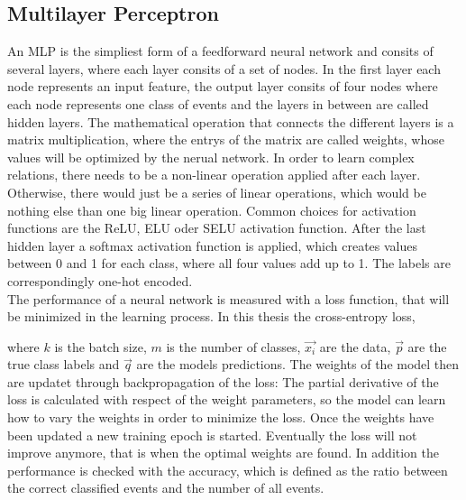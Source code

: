 \label{sec:deepl}

\subsection{Multilayer Perceptron}
\label{sec:funcmlp}

An MLP is the simpliest form of a feedforward neural network and consits of several layers, where each layer consits of a set of nodes. In the first layer each node represents an input feature, the output layer consits of four nodes where each node represents one class of events
and the layers in between are called hidden layers. The mathematical operation that connects the different layers
is a matrix multiplication, where the entrys of the matrix are called weights, whose values will be optimized by the nerual network. In order to learn complex
relations, there needs to be a non-linear operation applied after each layer. Otherwise, there would just be a series of linear operations, which would be nothing else
than one big linear operation. Common choices for activation functions are the ReLU, ELU oder SELU activation function. After the last hidden layer a softmax activation function is applied,
which creates values between 0 and 1 for each class, where all four values add up to 1. The labels are correspondingly one-hot encoded. \\

The performance of a neural network is measured with a loss function, that will be minimized in the learning process. In this thesis the cross-entropy loss, 


where $k$ is the batch size, $m$ is the number of classes, $\vec{x_i}$ are the data, $\vec{p}$ are the true class labels and $\vec{q}$ are the models predictions.
The weights of the model then are updatet through backpropagation of the loss: The partial derivative of the loss is calculated with respect of the weight parameters, so the model can learn how to
vary the weights in order to minimize the loss. Once the weights have been updated a new training epoch is started.
Eventually the loss will not improve anymore, that is when the optimal weights are found. In addition the performance is checked with the accuracy, which is
defined as the ratio between the correct classified events and the number of all events. \\


